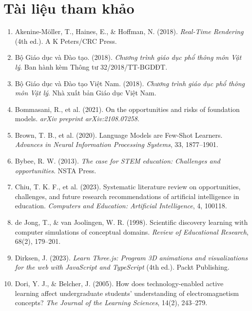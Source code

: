\chapter*{Tài liệu tham khảo}

\begin{enumerate}
\item Akenine-Möller, T., Haines, E., \& Hoffman, N. (2018). \textit{Real-Time Rendering} (4th ed.). A K Peters/CRC Press.

\item Bộ Giáo dục và Đào tạo. (2018). \textit{Chương trình giáo dục phổ thông môn Vật lý}. Ban hành kèm Thông tư 32/2018/TT-BGDĐT.

\item Bộ Giáo dục và Đào tạo Việt Nam. (2018). \textit{Chương trình giáo dục phổ thông môn Vật lý}. Nhà xuất bản Giáo dục Việt Nam.

\item Bommasani, R., et al. (2021). On the opportunities and risks of foundation models. \textit{arXiv preprint arXiv:2108.07258}.

\item Brown, T. B., et al. (2020). Language Models are Few-Shot Learners. \textit{Advances in Neural Information Processing Systems}, 33, 1877–1901.

\item Bybee, R. W. (2013). \textit{The case for STEM education: Challenges and opportunities}. NSTA Press.

\item Chiu, T. K. F., et al. (2023). Systematic literature review on opportunities, challenges, and future research recommendations of artificial intelligence in education. \textit{Computers and Education: Artificial Intelligence}, 4, 100118.

\item de Jong, T., \& van Joolingen, W. R. (1998). Scientific discovery learning with computer simulations of conceptual domains. \textit{Review of Educational Research}, 68(2), 179–201.

\item Dirksen, J. (2023). \textit{Learn Three.js: Program 3D animations and visualizations for the web with JavaScript and TypeScript} (4th ed.). Packt Publishing.

\item Dori, Y. J., \& Belcher, J. (2005). How does technology-enabled active learning affect undergraduate students' understanding of electromagnetism concepts? \textit{The Journal of the Learning Sciences}, 14(2), 243–279.


\end{enumerate}
